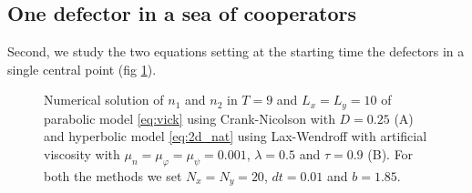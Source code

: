 \subsection{One defector in a sea of cooperators}

Second, we study the two equations setting at the starting time the
defectors in a single central point (fig \ref{fig:onedef}). 

\begin{figure}

\caption{\label{fig:onedef}Numerical solution of $n_{1}$ and $n_{2}$ in
$T=9$ and $L_{x}=L_{y}=10$ of parabolic model \ref{eq:vick} using
Crank-Nicolson with $D=0.25$ (A) and hyperbolic model \ref{eq:2d_nat}
using Lax-Wendroff with artificial viscosity with $\mu_{n}=\mu_{\varphi}=\mu_{\psi}=0.001$,
$\lambda=0.5$ and $\tau=0.9$ (B). For both the methods we set $N_{x}=N_{y}=20$,
$dt=0.01$ and $b=1.85$.}
\end{figure}


